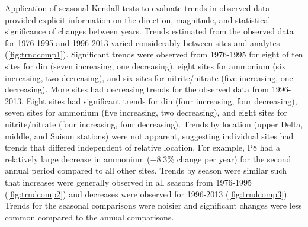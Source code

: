 \documentclass[journal = esthag, manuscript = article]{achemso}\usepackage[]{graphicx}\usepackage[]{color}
\begin{document}
Application of seasonal Kendall tests to evaluate trends in observed data provided explicit information on the direction, magnitude, and statistical significance of changes between years. Trends estimated from the observed data for 1976-1995 and 1996-2013 varied considerably between sites and analytes (\cref{fig:trndcomp1}). Significant trends were observed from 1976-1995 for eight of ten sites for \ac{din} (seven increasing, one decreasing), eight sites for ammonium (six increasing, two decreasing), and six sites for nitrite/nitrate (five increasing, one decreasing).  More sites had decreasing trends for the observed data from 1996-2013.  Eight sites had significant trends for \ac{din} (four increasing, four decreasing), seven sites for ammonium (five increasing, two decreasing), and eight sites for nitrite/nitrate (four increasing, four decreasing). Trends by location (upper Delta, middle, and Suisun stations) were not apparent, suggesting individual sites had trends that differed independent of relative location.  For example, P8 had a relatively large decrease in ammonium ($-8.3$\% change per year) for the second annual period compared to all other sites. Trends by season were similar such that increases were generally observed in all seasons from 1976-1995 (\cref{fig:trndcomp2}) and decreases were observed for 1996-2013 (\cref{fig:trndcomp3}).  Trends for the seasonal comparisons were noisier and significant changes were less common compared to the annual comparisons.
\end{document}
